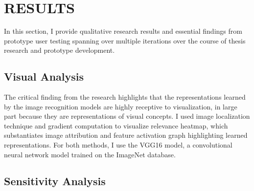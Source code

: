\chapter{RESULTS}

\graphicspath{ {./results/} }
\thispagestyle{empty}


In this section, I provide qualitative research results and essential findings from prototype user testing spanning over multiple iterations over the course of thesis research and prototype development. 

\section{Visual Analysis}

The critical finding from the research highlights that the representations learned by the image recognition models are highly receptive to visualization, in large part because they are representations of visual concepts. I used image localization technique and gradient computation to visualize relevance heatmap, which substantiates image attribution and feature activation graph highlighting learned representations. For both methods, I use the VGG16 model, a convolutional neural network model trained on the ImageNet database.

\section*{Sensitivity Analysis}


